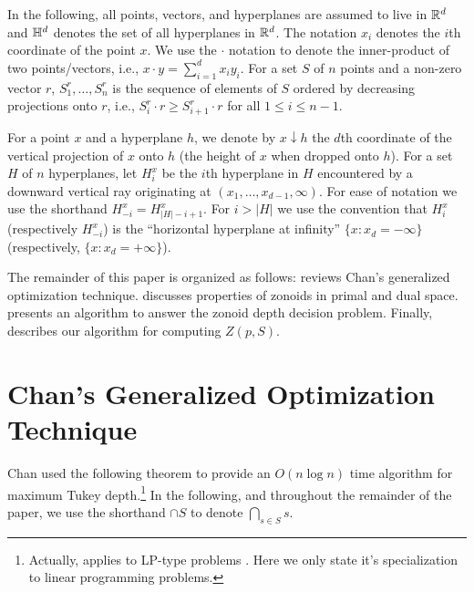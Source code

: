 \documentclass[lotsofwhite]{patmorin}
\newcommand{\drop}{\!\!\downarrow\!\!}
\begin{document}
In the following, all points, vectors, and hyperplanes are assumed to
live in $\mathbb{R}^d$ and $\mathbb{H}^d$ denotes the set of all hyperplanes in
$\mathbb{R}^d$.  The notation $x_i$ denotes the $i$th coordinate of the point
$x$.  We use the $\cdot$ notation to denote the inner-product of two
points/vectors, i.e., $x\cdot y=\sum_{i=1}^d x_iy_i$.  For a set $S$
of $n$ points and a non-zero vector $r$, $S_1^r,\ldots,S_n^r$ is the
sequence of elements of $S$ ordered by decreasing projections onto
$r$, i.e., $S_i^r\cdot r \ge S_{i+1}^r\cdot r$ for all $1\le i\le
n-1$.

For a point $x$ and a hyperplane $h$, we denote by $x\drop h$ the
$d$th coordinate of the vertical projection of $x$ onto $h$ (the
height of $x$ when dropped onto $h$).  For a set $H$ of $n$
hyperplanes, let $H_i^x$ be the $i$th hyperplane in $H$ encountered by
a downward vertical ray originating at $(x_1,\ldots,x_{d-1},\infty)$.
For ease of notation we use the shorthand $H_{-i}^x=H_{|H|-i+1}^x$.
For $i>|H|$ we use the convention that $H_{i}^x$ (respectively
$H_{-i}^x$) is the ``horizontal hyperplane at infinity''
$\{x:x_d=-\infty\}$ (respectively, $\{x:x_d=+\infty\}$). 

The remainder of this paper is organized as follows: 
reviews Chan's generalized optimization technique.  
discusses properties of zonoids in primal and dual space.
 presents an algorithm to answer the zonoid depth
decision problem.  Finally,  describes our
algorithm for computing $Z(p,S)$.
 
\section{Chan's Generalized Optimization Technique}

Chan \cite{c04} used the following theorem to provide an $O(n\log n)$
time algorithm for maximum Tukey depth.\footnote{Actually,
 applies to LP-type problems \cite{sw92}. Here we only
state it's specialization to linear programming problems.}  In the
following, and throughout the remainder of the paper, we use the
shorthand $\cap S$ to denote $\bigcap_{s\in S}s$.
\end{document}
